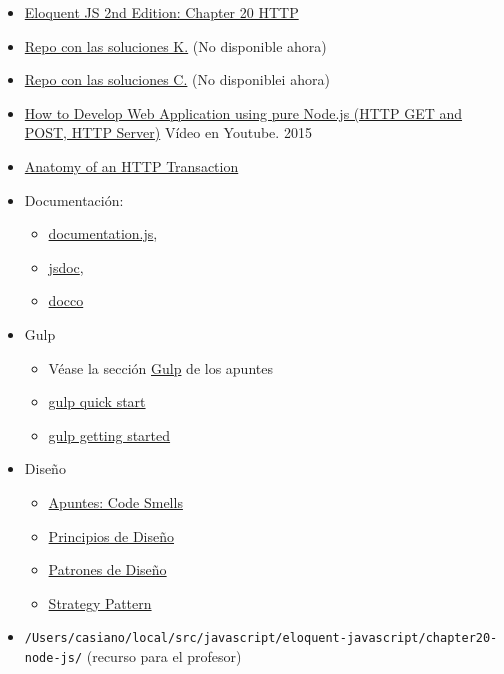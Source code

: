 \documentclass[]{article}
\providecommand{\tightlist}{%
  \setlength{\itemsep}{0pt}\setlength{\parskip}{0pt}}
\begin{document}
\begin{itemize}
\tightlist
\item
  \href{http://eloquentjavascript.net/2nd_edition/20_node.html}{Eloquent
  JS 2nd Edition: Chapter 20 HTTP}
\item
  \href{https://github.com/ULL-ESIT-MII-CA-1718/nodejs-KevMCh}{Repo con
  las soluciones K.} (No disponible ahora)
\item
  \href{https://github.com/ULL-ESIT-MII-CA-1718/ejs-chapter20-node-js}{Repo
  con las soluciones C.} (No disponiblei ahora)
\item
  \href{https://youtu.be/nuw48-u3Yrg}{How to Develop Web Application
  using pure Node.js (HTTP GET and POST, HTTP Server)} Vídeo en Youtube.
  2015
\item
  \href{https://nodejs.org/en/docs/guides/anatomy-of-an-http-transaction/}{Anatomy
  of an HTTP Transaction}
\item
  Documentación:

  \begin{itemize}
  \tightlist
  \item
    \href{http://documentation.js.org/}{documentation.js},
  \item
    \href{https://www.npmjs.com/package/jsdoc}{jsdoc},
  \item
    \href{http://jashkenas.github.io/docco\%60}{docco}
  \end{itemize}
\item
  Gulp

  \begin{itemize}
  \tightlist
  \item
    Véase la sección
    \href{https://casianorodriguezleon.gitbooks.io/ull-esit-1617/apuntes/gulp/}{Gulp}
    de los apuntes
  \item
    \href{https://gulpjs.com/docs/en/getting-started/quick-start}{gulp
    quick start}
  \item
    \href{https://gulpjs.org/getting-started.html}{gulp getting started}
  \end{itemize}
\item
  Diseño

  \begin{itemize}
  \tightlist
  \item
    \href{https://casianorodriguezleon.gitbooks.io/ull-esit-1617/content/apuntes/patterns/codesmell.html}{Apuntes:
    Code Smells}
  \item
    \href{https://casianorodriguezleon.gitbooks.io/ull-esit-1617/content/apuntes/patterns/designprinciples.html}{Principios
    de Diseño}
  \item
    \href{https://casianorodriguezleon.gitbooks.io/ull-esit-1617/content/apuntes/patterns/}{Patrones
    de Diseño}
  \item
    \href{https://casianorodriguezleon.gitbooks.io/ull-esit-1617/content/apuntes/patterns/strategypattern.html}{Strategy
    Pattern}
  \end{itemize}
\item
  \texttt{/Users/casiano/local/src/javascript/eloquent-javascript/chapter20-node-js/}
  (recurso para el profesor)
\end{itemize}
\end{document}
